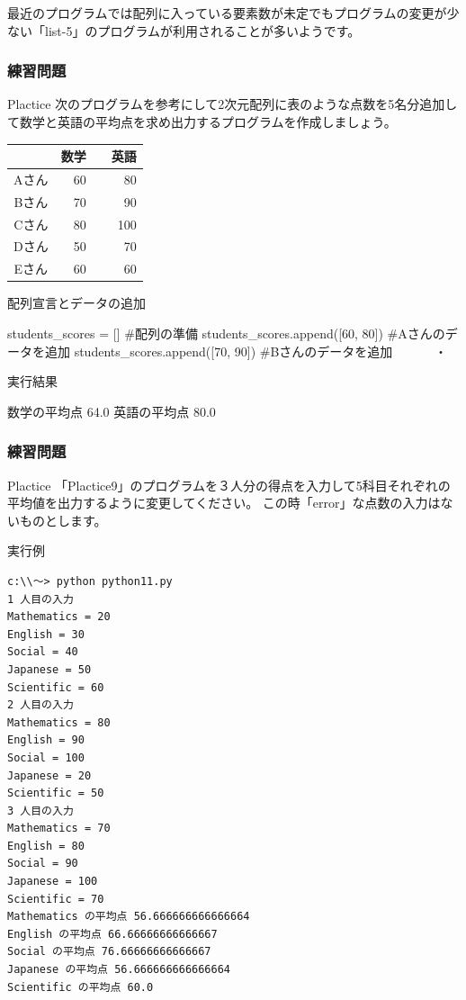\documentclass[11pt,a4paper,dvipdfmx,titlepage]{jsreport}
\begin{document}
最近のプログラムでは配列に入っている要素数が未定でもプログラムの変更が少ない「list-5」のプログラムが利用されることが多いようです。
\newpage
\subsubsection{練習問題}
\begin{plabox}{Plactice}
次のプログラムを参考にして2次元配列に表のような点数を5名分追加して数学と英語の平均点を求め出力するプログラムを作成しましょう。


\begin{center}
\begin{tabular}{|c|r|r|} 
\hline
 & 数学 &　英語 \\ \hline \hline
 Aさん &  60& 80  \\ \hline
 Bさん &  70& 90  \\ \hline
 Cさん &  80& 100  \\ \hline
 Dさん &  50& 70  \\ \hline
 Eさん &  60& 60  \\ \hline
\end{tabular}
\end{center}

\begin{codebox}{配列宣言とデータの追加}
\begin{listing}{1}
students_scores = []
#配列の準備
students_scores.append([60, 80]) #Aさんのデータを追加
students_scores.append([70, 90]) #Bさんのデータを追加
　　　・
\end{listing}
実行結果
\begin{listing}{1}
数学の平均点 64.0
英語の平均点 80.0
\end{listing}
\end{codebox}
\end{plabox}
\newpage
\subsubsection{練習問題}
\begin{plabox}{Plactice}
「Plactice9」のプログラムを３人分の得点を入力して5科目それぞれの平均値を出力するように変更してください。
この時「error」な点数の入力はないものとします。



\begin{codebox}{実行例}
\begin{verbatim}
c:\\～> python python11.py
1 人目の入力
Mathematics = 20
English = 30
Social = 40
Japanese = 50
Scientific = 60
2 人目の入力
Mathematics = 80
English = 90
Social = 100
Japanese = 20
Scientific = 50
3 人目の入力
Mathematics = 70
English = 80
Social = 90
Japanese = 100
Scientific = 70
Mathematics の平均点 56.666666666666664
English の平均点 66.66666666666667
Social の平均点 76.66666666666667
Japanese の平均点 56.666666666666664
Scientific の平均点 60.0
\end{verbatim}
\end{codebox}
\end{plabox}
\newpage
\end{document}

